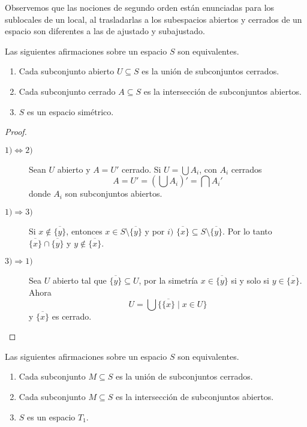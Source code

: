 \documentclass{comunicaciones}
\begin{document}
Observemos que las nociones de segundo orden están enunciadas para los sublocales de un local, al trasladarlas a los subespacios abiertos y cerrados de un espacio son diferentes a las de ajustado y subajustado.

\begin{prop}
Las siguientes afirmaciones sobre un espacio $S$ son equivalentes.
\begin{enumerate}
    \item Cada subconjunto abierto $U\subseteq S$ es la unión de subconjuntos cerrados.
    \item Cada subconjunto cerrado $A\subseteq S$ es la intersección de subconjuntos abiertos.
    \item $S$ es un espacio simétrico.
\end{enumerate}
\end{prop}

\begin{proof}
    \begin{description}
        \item[$1)\Leftrightarrow 2)$] Sean $U$ abierto y $A=U'$ cerrado. Si $U=\bigcup A_i$, con $A_i$ cerrados
        \[
        A=U'=(\bigcup A_i)'=\bigcap A_i'
        \]
        donde $A_i$ son subconjuntos abiertos.
        \item[$1)\Rightarrow 3)$] Si $x\notin \overline{\{y\}}$, entonces $x\in S\setminus \overline{\{y\}}$ y por $i)$ $\overline{\{x\}}\subseteq S\setminus \overline{\{y\}}$. Por lo tanto $\overline{\{x\}}\cap \overline{\{y\}}$ y $y\notin \overline{\{x\}}$. 
        \item[$3)\Rightarrow 1)$] Sea $U$ abierto tal que $\overline{\{y\}}\subseteq U$, por la simetría $x\in \overline{\{y\}}$ si y solo si $y\in \overline{\{x\}}$. Ahora 
        \[
        U=\bigcup\{\overline{\{x\}}\mid x\in U\}
        \]
        y $\overline{\{x\}}$ es cerrado.
    \end{description}
\end{proof}

\begin{prop}
    Las siguientes afirmaciones sobre un espacio $S$ son equivalentes.
    \begin{enumerate}
        \item Cada subconjunto $M\subseteq S$ es la unión de subconjuntos cerrados.
        \item Cada subconjunto $M\subseteq S$ es la intersección de subconjuntos abiertos.
        \item $S$ es un espacio $T_1$.
    \end{enumerate}
\end{prop}
\end{document}
